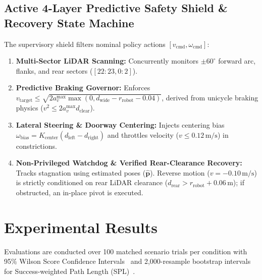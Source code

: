 \documentclass[conference]{IEEEtran}
\begin{document}
\subsection{Active 4-Layer Predictive Safety Shield \& Recovery State Machine}
The supervisory shield filters nominal policy actions $[v_{\text{cmd}}, \omega_{\text{cmd}}]$:
\begin{enumerate}
    \item \textbf{Multi-Sector LiDAR Scanning:} Concurrently monitors $\pm 60^\circ$ forward arc, flanks, and rear sectors ($[22:23, 0:2]$).
    \item \textbf{Predictive Braking Governor:} Enforces $v_{\text{target}} \le \sqrt{2 a_v^{\max} \max(0, d_{\text{wide}} - r_{\text{robot}} - 0.04)}$, derived from unicycle braking physics ($v^2 \le 2 a_v^{\max} d_{\text{clear}}$).
    \item \textbf{Lateral Steering \& Doorway Centering:} Injects centering bias $\omega_{\text{bias}} = K_{\text{center}}(d_{\text{left}} - d_{\text{right}})$ and throttles velocity ($v \le 0.12\,\text{m/s}$) in constrictions.
    \item \textbf{Non-Privileged Watchdog \& Verified Rear-Clearance Recovery:} Tracks stagnation using estimated poses ($\hat{\mathbf{p}}$). Reverse motion ($v = -0.10\,\text{m/s}$) is strictly conditioned on rear LiDAR clearance ($d_{\text{rear}} > r_{\text{robot}} + 0.06\,\text{m}$); if obstructed, an in-place pivot is executed.
\end{enumerate}

\section{Experimental Results}
Evaluations are conducted over 100 matched scenario trials per condition with 95\% Wilson Score Confidence Intervals~\cite{wilson1927probable} and 2,000-resample bootstrap intervals for Success-weighted Path Length (SPL)~\cite{anderson2018evaluation}.
\end{document}
